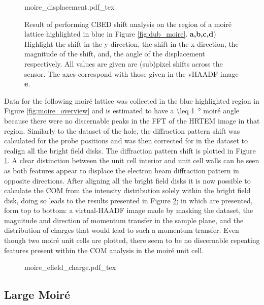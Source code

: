\begin{figure}
    \centering
    \def\svgwidth{.95\linewidth}
    {moire_displacement.pdf_tex}
    \caption{Result of performing CBED shift analysis on the region of a moiré lattice highlighted in blue in Figure \ref{fig:dub_moire}. \textbf{a,b,c,d}) Highlight the shift in the y-direction, the shift in the x-direction, the magnitude of the shift, and, the angle of the displacement respectively. All values are given are (sub)pixel shifts across the sensor. The axes correspond with those given in the vHAADF image \textbf{e}.}
    \label{fig:m_dis}
\end{figure}

Data for the following moiré lattice was collected in the blue highlighted region in Figure \ref{fig:moire_overview} and is estimated to have a \SI{\leq 1}{\degree} moiré angle because there were no discernable peaks in the FFT of the HRTEM image in that region. Similarly to the dataset of the hole, the diffraction pattern shift was calculated for the probe positions and was then corrected for in the dataset to realign all the bright field disks. The diffraction pattern shift is plotted in Figure \ref{fig:m_dis}. A clear distinction between the unit cell interior and unit cell walls can be seen as both features appear to displace the electron beam diffraction pattern in opposite directions. After aligning all the bright field disks it is now possible to calculate the COM from the intensity distribution solely within the bright field disk, doing so leads to the results presented in Figure \ref{fig:m_mom}; in which are presented, form top to bottom: a virtual-HAADF image made by masking the dataset, the magnitude and direction of momentum transfer in the sample plane, and the distribution of charges that would lead to such a momentum transfer. Even though two moiré unit cells are plotted, there seem to be no discernable repeating features present within the COM analysis in the moiré unit cell.

\begin{figure}
    \centering
    \def\svgwidth{.5\linewidth}
    {moire_efield_charge.pdf_tex}
    \caption{}
    \label{fig:m_mom}
\end{figure}

\subsection{Large Moiré}
\label{sec:large_moire}

